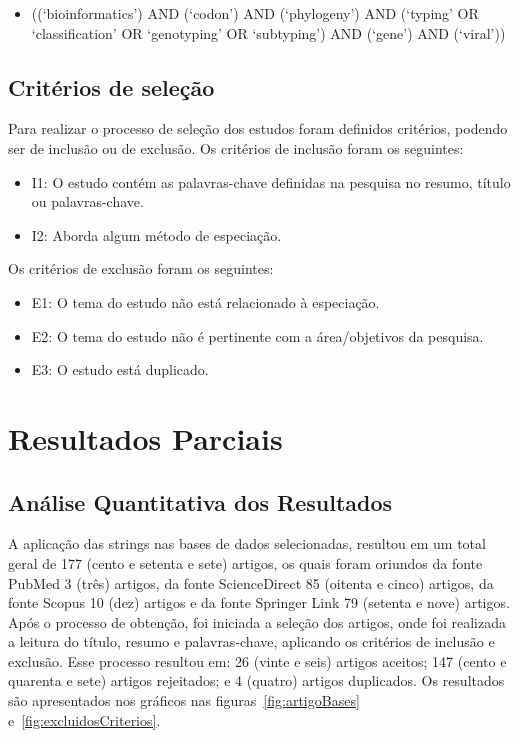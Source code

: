 \documentclass[12pt]{article}
\begin{document}
\begin{itemize}
    \item ((`bioinformatics') AND (`codon') AND (`phylogeny') AND (`typing' OR `classification' OR `genotyping' OR `subtyping') AND (`gene') AND (`viral'))
\end{itemize}

\subsection{Critérios de seleção}

Para realizar o processo de seleção dos estudos foram definidos critérios, podendo ser de inclusão ou de exclusão.
Os critérios de inclusão foram os seguintes:

\begin{itemize}
    \item I1: O estudo contém as palavras-chave definidas na pesquisa no resumo, título ou palavras-chave.
    \item I2: Aborda algum método de especiação.
\end{itemize}
Os critérios de exclusão foram os seguintes:
\begin{itemize}
    \item E1: O tema do estudo não está relacionado à especiação.
    \item E2: O tema do estudo não é pertinente com a área/objetivos da pesquisa.
    \item E3: O estudo está duplicado.
\end{itemize}

\section{Resultados Parciais}

\subsection{Análise Quantitativa dos Resultados}

A aplicação das strings nas bases de dados selecionadas, resultou em um total geral de 177 (cento e setenta e sete) artigos, os quais foram oriundos da fonte PubMed 3 (três) artigos, da fonte ScienceDirect 85 (oitenta e cinco) artigos, da fonte Scopus 10 (dez) artigos e da fonte Springer Link 79 (setenta e nove) artigos.\\
Após o processo de obtenção, foi iniciada a seleção dos artigos, onde foi realizada a leitura do título, resumo e palavras-chave, aplicando os critérios de inclusão e exclusão. Esse processo resultou em: 26 (vinte e seis) artigos aceitos; 147 (cento e quarenta e sete) artigos rejeitados; e 4 (quatro) artigos duplicados. Os resultados são apresentados nos gráficos nas figuras~\ref{fig:artigoBases} e~\ref{fig:excluidosCriterios}.\\
\end{document}
